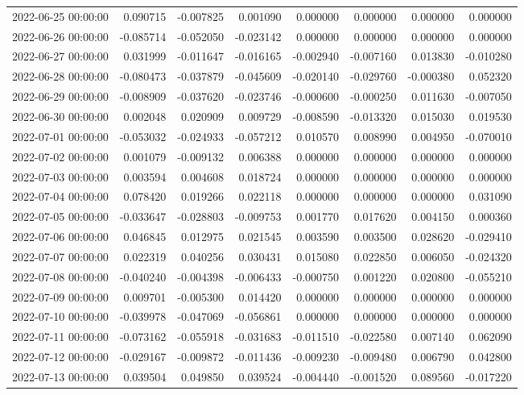 \begin{tabular}{lrrrrrrr}
2022-06-25 00:00:00 & 0.090715 & -0.007825 & 0.001090 & 0.000000 & 0.000000 & 0.000000 & 0.000000 \\
2022-06-26 00:00:00 & -0.085714 & -0.052050 & -0.023142 & 0.000000 & 0.000000 & 0.000000 & 0.000000 \\
2022-06-27 00:00:00 & 0.031999 & -0.011647 & -0.016165 & -0.002940 & -0.007160 & 0.013830 & -0.010280 \\
2022-06-28 00:00:00 & -0.080473 & -0.037879 & -0.045609 & -0.020140 & -0.029760 & -0.000380 & 0.052320 \\
2022-06-29 00:00:00 & -0.008909 & -0.037620 & -0.023746 & -0.000600 & -0.000250 & 0.011630 & -0.007050 \\
2022-06-30 00:00:00 & 0.002048 & 0.020909 & 0.009729 & -0.008590 & -0.013320 & 0.015030 & 0.019530 \\
2022-07-01 00:00:00 & -0.053032 & -0.024933 & -0.057212 & 0.010570 & 0.008990 & 0.004950 & -0.070010 \\
2022-07-02 00:00:00 & 0.001079 & -0.009132 & 0.006388 & 0.000000 & 0.000000 & 0.000000 & 0.000000 \\
2022-07-03 00:00:00 & 0.003594 & 0.004608 & 0.018724 & 0.000000 & 0.000000 & 0.000000 & 0.000000 \\
2022-07-04 00:00:00 & 0.078420 & 0.019266 & 0.022118 & 0.000000 & 0.000000 & 0.000000 & 0.031090 \\
2022-07-05 00:00:00 & -0.033647 & -0.028803 & -0.009753 & 0.001770 & 0.017620 & 0.004150 & 0.000360 \\
2022-07-06 00:00:00 & 0.046845 & 0.012975 & 0.021545 & 0.003590 & 0.003500 & 0.028620 & -0.029410 \\
2022-07-07 00:00:00 & 0.022319 & 0.040256 & 0.030431 & 0.015080 & 0.022850 & 0.006050 & -0.024320 \\
2022-07-08 00:00:00 & -0.040240 & -0.004398 & -0.006433 & -0.000750 & 0.001220 & 0.020800 & -0.055210 \\
2022-07-09 00:00:00 & 0.009701 & -0.005300 & 0.014420 & 0.000000 & 0.000000 & 0.000000 & 0.000000 \\
2022-07-10 00:00:00 & -0.039978 & -0.047069 & -0.056861 & 0.000000 & 0.000000 & 0.000000 & 0.000000 \\
2022-07-11 00:00:00 & -0.073162 & -0.055918 & -0.031683 & -0.011510 & -0.022580 & 0.007140 & 0.062090 \\
2022-07-12 00:00:00 & -0.029167 & -0.009872 & -0.011436 & -0.009230 & -0.009480 & 0.006790 & 0.042800 \\
2022-07-13 00:00:00 & 0.039504 & 0.049850 & 0.039524 & -0.004440 & -0.001520 & 0.089560 & -0.017220 \\

\end{tabular}
